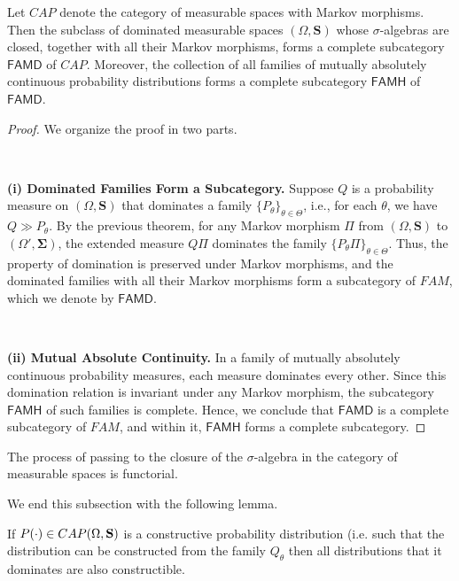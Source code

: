 \begin{theorem}
Let $CAP$ denote the category of measurable spaces with Markov morphisms. Then the subclass of dominated measurable spaces $(\Omega, \mathbf{S})$ whose $\sigma$-algebras are closed, together with all their Markov morphisms, forms a complete subcategory $\mathsf{FAMD}$ of $CAP$. Moreover, the collection of all families of mutually absolutely continuous probability distributions forms a complete subcategory $\mathsf{FAMH}$ of $\mathsf{FAMD}$.
\end{theorem}
\begin{proof}
We organize the proof in two parts.

\, 

\textbf{(i) Dominated Families Form a Subcategory.}  
Suppose $Q$ is a probability measure on $(\Omega,\mathbf{S})$ that dominates a family $\{P_\theta\}_{\theta \in \Theta}$, i.e., for each $\theta$, we have $Q \gg P_\theta$. By the previous theorem, for any Markov morphism $\Pi$ from $(\Omega,\mathbf{S})$ to $(\Omega',\mathbf{\Sigma})$, the extended measure $Q\Pi$ dominates the family $\{P_\theta\Pi\}_{\theta \in \Theta}$. Thus, the property of domination is preserved under Markov morphisms, and the dominated families with all their Markov morphisms form a subcategory of $FAM$, which we denote by $\mathsf{FAMD}$.

\, 

\textbf{(ii) Mutual Absolute Continuity.}  
In a family of mutually absolutely continuous probability measures, each measure dominates every other. Since this domination relation is invariant under any Markov morphism, the subcategory $\mathsf{FAMH}$ of such families is complete.
Hence, we conclude that $\mathsf{FAMD}$ is a complete subcategory of $FAM$, and within it, $\mathsf{FAMH}$ forms a complete subcategory.
\end{proof}


\begin{remark}
The process of passing to the closure of the $\sigma$-algebra in the category of measurable spaces is functorial.
\end{remark}

We end this subsection with the following lemma. 
\begin{lemma}\label{L:7.2}
If $P(\cdot)\in CAP(\Omega,{\bf S})$ is a constructive probability distribution (i.e. such that the distribution can be constructed from the family $Q_\theta$
 then all distributions that it dominates are also constructible.  
\end{lemma}

